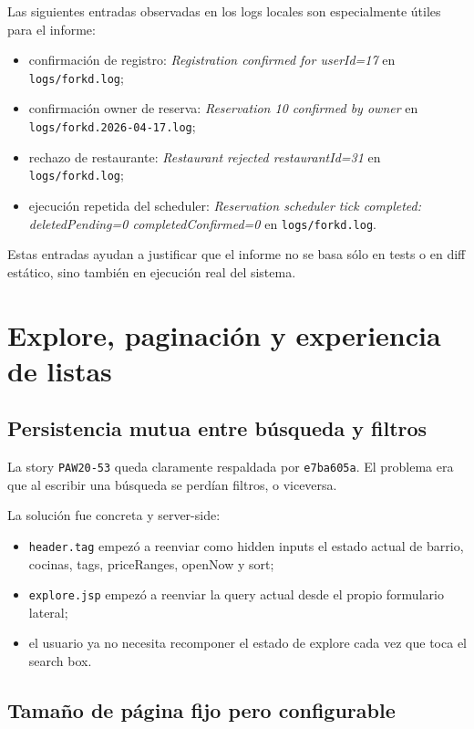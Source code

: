 \documentclass[11pt,a4paper]{report}
\newcommand{\commit}[1]{\texttt{#1}}
\newcommand{\code}[1]{\nolinkurl{#1}}
\newcommand{\story}[1]{\texttt{#1}}
\begin{document}
Las siguientes entradas observadas en los logs locales son especialmente \'utiles para el informe:

\begin{itemize}
  \item confirmaci\'on de registro: \emph{Registration confirmed for userId=17} en \code{logs/forkd.log};
  \item confirmaci\'on owner de reserva: \emph{Reservation 10 confirmed by owner} en \code{logs/forkd.2026-04-17.log};
  \item rechazo de restaurante: \emph{Restaurant rejected restaurantId=31} en \code{logs/forkd.log};
  \item ejecuci\'on repetida del scheduler: \emph{Reservation scheduler tick completed: deletedPending=0 completedConfirmed=0} en \code{logs/forkd.log}.
\end{itemize}

Estas entradas ayudan a justificar que el informe no se basa s\'olo en tests o en diff est\'atico, sino tambi\'en en ejecuci\'on real del sistema.

\chapter{Explore, paginaci\'on y experiencia de listas}

\section{Persistencia mutua entre b\'usqueda y filtros}

La story \story{PAW20-53} queda claramente respaldada por \commit{e7ba605a}. El problema era que al escribir una b\'usqueda se perd\'ian filtros, o viceversa.

La soluci\'on fue concreta y server-side:

\begin{itemize}
  \item \code{header.tag} empez\'o a reenviar como hidden inputs el estado actual de barrio, cocinas, tags, priceRanges, openNow y sort;
  \item \code{explore.jsp} empez\'o a reenviar la query actual desde el propio formulario lateral;
  \item el usuario ya no necesita recomponer el estado de explore cada vez que toca el search box.
\end{itemize}

\section{Tama\~no de p\'agina fijo pero configurable}
\end{document}
